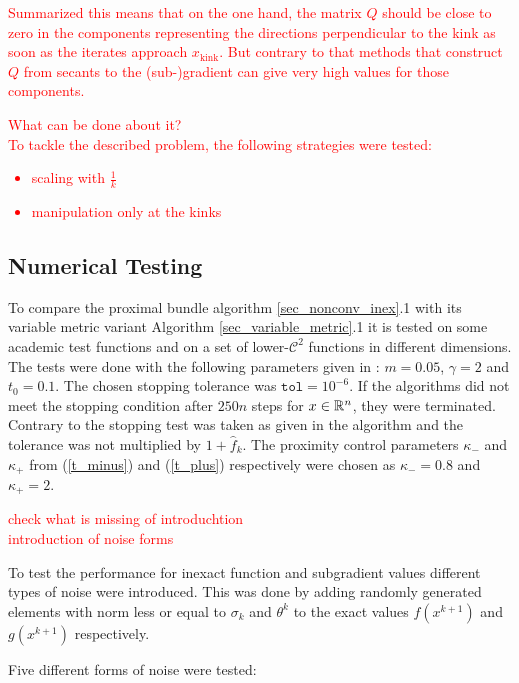 \textcolor{red}{Summarized this means that on the one hand, the matrix \(Q\) should be close to zero in the components representing the directions perpendicular to the kink as soon as the iterates approach \(x_{\text{kink}}\). But contrary to that methods that construct \(Q\) from secants to the (sub-)gradient can give very high values for those components.}

\textcolor{red}{What can be done about it?\\
To tackle the described problem, the following strategies were tested: 
\begin{itemize}
	\item scaling with \(\frac{1}{k}\)
	\item manipulation only at the kinks
\end{itemize}}

\subsection{Numerical Testing}

To compare the proximal bundle algorithm \ref{sec_nonconv_inex}.1 with its variable metric variant Algorithm  \ref{sec_variable_metric}.1 it is tested on some academic test functions and on a set of lower-\(\mathcal{C}^2\) functions in different dimensions.
The tests were done with the following parameters given in \cite{Hare2016}: \(m = 0.05\), \(\gamma = 2\) and \(t_0 = 0.1\). The chosen stopping tolerance was \(\mathtt{tol} = 10^{-6}\). If the algorithms did not meet the stopping condition after \(250n\) steps for \(x \in \mathbb{R}^n\), they were terminated. Contrary to \cite{Hare2016} the stopping test was taken as given in the algorithm and the tolerance was not multiplied by \(1+\hat{f}_k\).
The proximity control parameters \(\kappa_-\) and \(\kappa_+\) from (\ref{t_minus}) and (\ref{t_plus}) respectively were chosen as \(\kappa_-= 0.8\) and \(\kappa_+=2\).  

\textcolor{red}{check what is missing of introduchtion \\
introduction of noise forms}

To test the performance for inexact function and subgradient values different types of noise were introduced. This was done by adding randomly generated elements with norm less or equal to \(\sigma_k\) and \(\theta^k\) to the exact values \(f(x^{k+1})\) and \(g(x^{k+1})\) respectively.

Five different forms of noise were tested:


